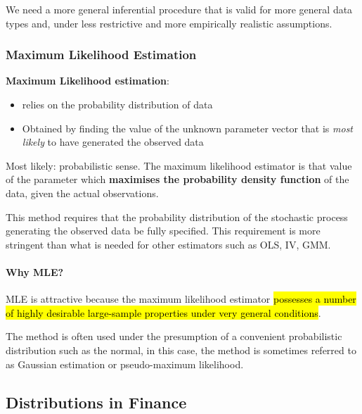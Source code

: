 \documentclass[11pt]{article}
\begin{document}
We need a more general inferential procedure that is valid for more general data types and, under less restrictive and more empirically realistic assumptions.

\subsubsection{Maximum Likelihood Estimation}

\begin{definition}
    \textbf{Maximum Likelihood estimation}:
    \begin{itemize}
        \item relies on the probability distribution of data
        \item Obtained by finding the value of the unknown parameter vector that is \textit{most likely} to have generated the observed data
    \end{itemize}
\end{definition}
\begin{note}
    Most likely: probabilistic sense. The maximum likelihood estimator is that value of the parameter which \textbf{maximises the probability density function} of the data, given the actual observations.
\end{note}

This method requires that the probability distribution of the stochastic process generating the observed data be fully specified. This requirement is more stringent than what is needed for other estimators such as OLS, IV, GMM.

\paragraph{Why MLE?}\mbox{}

MLE is attractive because the maximum likelihood estimator \hl{possesses a number of highly desirable large-sample properties under very general conditions}.

The method is often used under the presumption of a convenient probabilistic distribution such as the normal, in this case, the method is sometimes referred to as Gaussian estimation or pseudo-maximum likelihood.

\subsection{Distributions in Finance}
\end{document}
